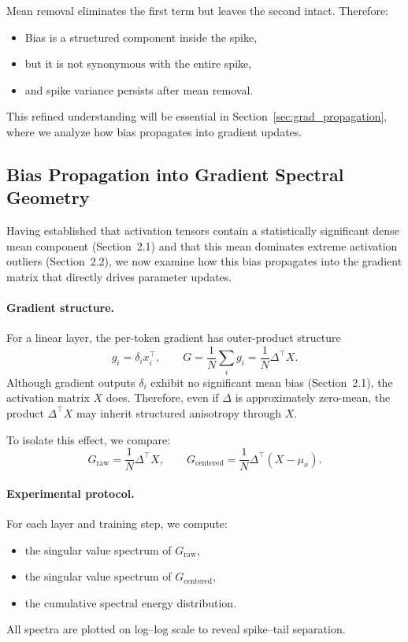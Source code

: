Mean removal eliminates the first term but leaves the second intact.
Therefore:

\begin{itemize}
\item Bias is a structured component inside the spike,
\item but it is not synonymous with the entire spike,
\item and spike variance persists after mean removal.
\end{itemize}

This refined understanding will be essential in Section~\ref{sec:grad_propagation},
where we analyze how bias propagates into gradient updates.

\subsection{Bias Propagation into Gradient Spectral Geometry}
\label{subsec:grad_spectrum_bias}

Having established that activation tensors contain a statistically significant
dense mean component (Section~2.1) and that this mean dominates extreme
activation outliers (Section~2.2), we now examine how this bias propagates into
the gradient matrix that directly drives parameter updates.

\paragraph{Gradient structure.}
For a linear layer, the per-token gradient has outer-product structure
\[
g_i = \delta_i x_i^\top,
\qquad
G = \frac{1}{N}\sum_i g_i = \frac{1}{N}\Delta^\top X.
\]
Although gradient outputs $\delta_i$ exhibit no significant mean bias
(Section~2.1), the activation matrix $X$ does.
Therefore, even if $\Delta$ is approximately zero-mean, the product
$\Delta^\top X$ may inherit structured anisotropy through $X$.

To isolate this effect, we compare:
\[
G_{\text{raw}} = \frac{1}{N}\Delta^\top X,
\qquad
G_{\text{centered}} = \frac{1}{N}\Delta^\top (X - \mu_x).
\]

\paragraph{Experimental protocol.}
For each layer and training step, we compute:
\begin{itemize}
\item the singular value spectrum of $G_{\text{raw}}$,
\item the singular value spectrum of $G_{\text{centered}}$,
\item the cumulative spectral energy distribution.
\end{itemize}
All spectra are plotted on log–log scale to reveal spike–tail separation.


